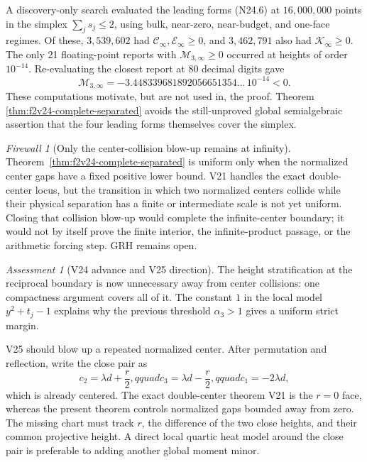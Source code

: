 \documentclass[11pt]{article}
\theoremstyle{definition}
\theoremstyle{remark}
\newtheorem{assessment}[theorem]{Assessment}
\newtheorem{firewall}[theorem]{Firewall}
\begin{document}
A discovery-only search evaluated the leading forms \textup{(N24.6)}
at \(16{,}000{,}000\) points in the simplex \(\sum_js_j\leq2\), using
bulk, near-zero, near-budget, and one-face regimes.  Of these,
\(3{,}539{,}602\) had \(\mathcal C_\infty,\mathcal E_\infty\geq0\),
and \(3{,}462{,}791\) also had \(\mathcal K_\infty\geq0\).  The only
21 floating-point reports with \(\mathcal M_{3,\infty}\geq0\) occurred
at heights of order \(10^{-14}\).  Re-evaluating the closest report at
80 decimal digits gave
\[
 \mathcal M_{3,\infty}
 =-3.448339681892056651354\ldots\,10^{-14}<0.
 \tag{N24.29}
\]
These computations motivate, but are not used in, the proof.  Theorem
\ref{thm:f2v24-complete-separated} avoids the still-unproved global
semialgebraic assertion that the four leading forms themselves cover the
simplex.

\begin{firewall}[Only the center-collision blow-up remains at infinity]
\label{fire:f2v24}
Theorem~\ref{thm:f2v24-complete-separated} is uniform only when the
normalized center gaps have a fixed positive lower bound.  V21 handles
the exact double-center locus, but the transition in which two
normalized centers collide while their physical separation has a finite
or intermediate scale is not yet uniform.  Closing that collision
blow-up would complete the infinite-center boundary; it would not by
itself prove the finite interior, the infinite-product passage, or the
arithmetic forcing step.  GRH remains open.
\end{firewall}

\begin{assessment}[V24 advance and V25 direction]
\label{ass:f2v24}
The height stratification at the reciprocal boundary is now unnecessary
away from center collisions: one compactness argument covers all of it.
The constant \(1\) in the local model \(y^2+t_j-1\) explains why the
previous threshold \(\alpha_3>1\) gives a uniform strict margin.

V25 should blow up a repeated normalized center.  After permutation and
reflection, write the close pair as
\[
 c_2=\lambda d+\frac r2,qquad
 c_3=\lambda d-\frac r2,qquad
 c_1=-2\lambda d,
 \tag{N24.30}
\]
which is already centered.  The exact
double-center theorem V21 is the \(r=0\) face, whereas the present theorem
controls normalized gaps bounded away from zero.  The missing chart must
track \(r\), the difference of the two close heights, and their common
projective height.  A direct local quartic heat model around the close
pair is preferable to adding another global moment minor.
\end{assessment}
\end{document}
